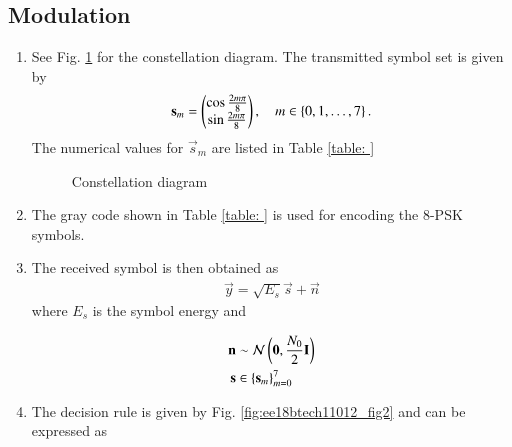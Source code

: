 \subsection{Modulation}
\begin{enumerate}[label=\thesubsection.\arabic*.,ref=\thesubsection.\theenumi]



\item See Fig. \ref{fig:ee18btech11012_fig1} for the constellation diagram.  The transmitted symbol set is given by 
\begin{align}
\mathbf{s}_m = \begin{pmatrix}\cos \frac{2m\pi}{8}\\ \sin \frac{2m\pi}{8}\end{pmatrix}, \quad m \in \left\{0,1,\dots,7\right\}.
\end{align}
%
The numerical values for $\vec{s}_m$ are listed in Table \ref{table: }
\begin{figure}[!ht]
                \resizebox{\columnwidth}{!}{}
\label{fig:ee18btech11012_fig1}
\caption{Constellation diagram}
\end{figure}


\item The gray code shown in Table \ref{table: } is used for encoding the 8-PSK symbols.


\item The received symbol is then obtained as
\begin{align}
\vec{y} = \sqrt{E_s}\vec{s} + \vec{n}
\end{align}
%
where $E_s$ is the symbol energy and 

\begin{align}
\mathbf{n} &\sim \mathcal{N}\left(\mathbf{0},\frac{N_0}{2}\mathbf{I}\right)
\\
\mathbf{s} &\in \left\{\mathbf{s}_m\right\}_{m = 0}^{7}
\end{align}

\item The decision rule is given by Fig. \ref{fig:ee18btech11012_fig2} and can be expressed as



\begin{figure}[!ht]

                \resizebox{\columnwidth}{!}{}


\end{figure}
\end{enumerate}
